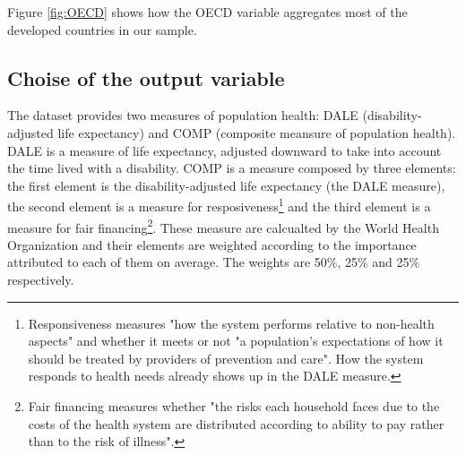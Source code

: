 \documentclass[12pt,a4paper]{article}\usepackage[]{graphicx}\usepackage[]{color}
\begin{document}

Figure \ref{fig:OECD} shows how the OECD variable aggregates most of the developed countries in our sample.





\subsection{Choise of the output variable}
The dataset provides two measures of population health: DALE (disability-adjusted life expectancy) and COMP (composite meansure of population health). DALE is a measure of life expectancy, adjusted downward to take into account the time lived with a disability. COMP is a measure composed by three elements: the first element is the disability-adjusted life expectancy (the DALE measure), the second element is a measure for resposiveness\footnote{Responsiveness measures "how the system performs relative to non-health aspects" and whether it meets or not "a population's expectations of how it should be treated by providers of prevention and care". How the system responds to health needs already shows up in the DALE measure.} and the third element is a measure for fair financing\footnote{Fair financing measures whether "the risks each household faces due to the costs of the health system are distributed according to ability to pay rather than to the risk of illness".}. These measure are calcualted by the World Health Organization and their elements are weighted according to the importance attributed to each of them on average. The weights are 50\%, 25\% and 25\% respectively. \\
\end{document}
